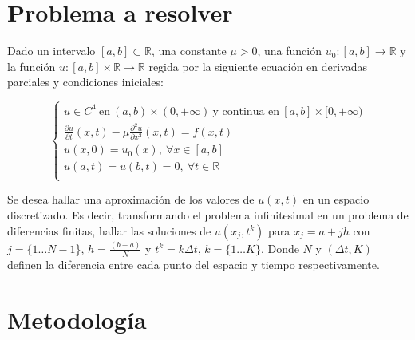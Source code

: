 \documentclass{endm}
\begin{document}
\section{Problema a resolver}\label{Problem}
Dado un intervalo $[a,b]\subset\mathbb{R}$, una constante $\mu>0$, una función $u_0 : [a,b]\rightarrow\mathbb{R}$ y la función $u : [a,b]\times\mathbb{R}\rightarrow\mathbb{R}$ regida por la siguiente ecuación en derivadas parciales y condiciones iniciales:

\begin{equation*} \label{problema0}
    \begin{cases}
        u \in C^4 \ \text{en} \ (a,b)\times(0,+\infty) \  \text{y continua en} \  [a,b]\times[0,+\infty) \\
       \frac{\partial u}{\partial t}(x,t) -\mu \frac{\partial^2 u}{\partial x^2}(x,t) = f(x,t) \\
       u(x,0) = u_0(x), \ \forall x \in [a,b]\\
       u(a,t) = u(b,t) = 0, \ \forall t \in \mathbb{R}\\
    \end{cases}
\end{equation*}

Se desea hallar una aproximación de los valores de $u(x,t)$ en un espacio discretizado.
Es decir, transformando el problema infinitesimal en un problema de diferencias
finitas, hallar las soluciones de $u(x_j,t^k)$ para $x_j = a + jh$ con $j = \{1 \dots
N-1$\}, $h=\frac{(b-a)}{N}$ y $t^k=k\Delta t$, $k= \{1 \dots K\}$. Donde $N$ y $(\Delta t, K)$  definen la diferencia entre cada punto del espacio y tiempo respectivamente. 
\section{Metodolog\'ia}\label{AA}
\end{document}
